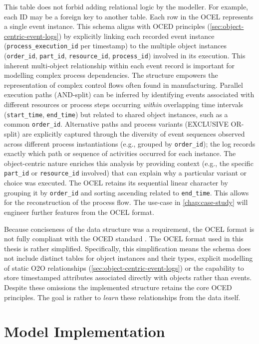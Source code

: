 This table does not forbid adding relational logic by the modeller. For example, each ID may be a foreign key to another table. Each row in the OCEL represents a single event instance. This schema aligns with OCED principles (\autoref{sec:object-centric-event-logs}) by explicitly linking each recorded event instance (\texttt{process\_execution\_id} per timestamp) to the multiple object instances (\texttt{order\_id}, \texttt{part\_id}, \texttt{resource\_id}, \texttt{process\_id}) involved in its execution. This inherent multi-object relationship within each event record is important for modelling complex process dependencies. The structure empowers the representation of complex control flows often found in manufacturing. Parallel execution paths (AND-split) can be inferred by identifying events associated with different resources or process steps occurring \textit{within} overlapping time intervals (\texttt{start\_time}, \texttt{end\_time}) but related to shared object instances, such as a common \texttt{order\_id}. Alternative paths and process variants (EXCLUSIVE OR-split) are explicitly captured through the diversity of event sequences observed across different process instantiations (e.g., grouped by \texttt{order\_id}); the log records exactly which path or sequence of activities occurred for each instance. The object-centric nature enriches this analysis by providing context (e.g., the specific \texttt{part\_id} or \texttt{resource\_id} involved) that can explain why a particular variant or choice was executed. The OCEL retains its sequential linear character by grouping it by \texttt{order\_id} and sorting ascending related to \texttt{end\_time}. This allows for the reconstruction of the process flow. The use-case in \autoref{chap:case-study} will engineer further features from the OCEL format.

Because conciseness of the data structure was a requirement, the OCEL format is not fully compliant with the OCED standard \autocite{van2023object}. The OCEL format used in this thesis is rather simplified. Specifically, this simplification means the schema does not include distinct tables for object instances and their types, explicit modelling of static O2O relationships (\autoref{sec:object-centric-event-logs}) or the capability to store timestamped attributes associated directly with objects rather than events. Despite these omissions the implemented structure retains the core OCED principles. The goal is rather to \textit{learn} these relationships from the data itself.

\section{Model Implementation}

